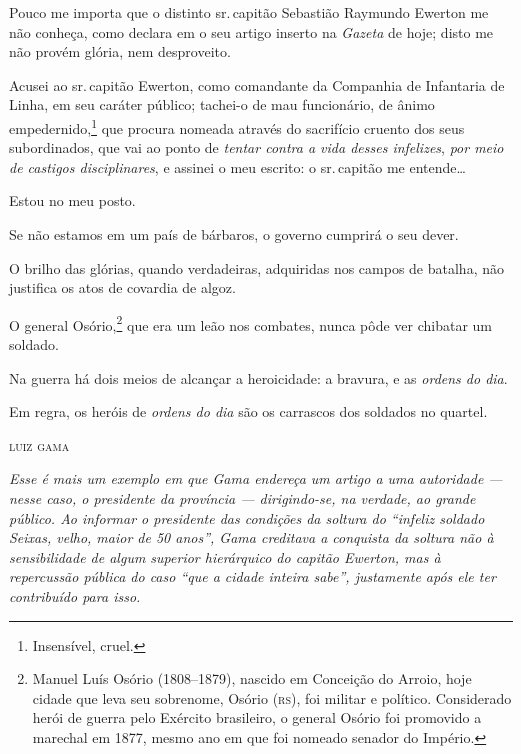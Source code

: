 {
Pouco me importa que o distinto sr.\,capitão Sebastião Raymundo Ewerton
me não conheça, como declara em o seu artigo inserto na \emph{Gazeta} de
hoje; disto me não provém glória, nem desproveito.

Acusei ao sr.\,capitão Ewerton, como comandante da Companhia de
Infantaria de Linha, em seu caráter público; tachei-o de mau
funcionário, de ânimo empedernido,\footnote{Insensível, cruel.} que
procura nomeada através do sacrifício cruento dos seus subordinados, que
vai ao ponto de \emph{tentar contra a vida desses infelizes}, \emph{por
meio de castigos disciplinares}, e assinei o meu escrito: o sr.\,capitão
me entende\ldots{}

Estou no meu posto.

Se não estamos em um país de bárbaros, o governo cumprirá o seu dever.

O brilho das glórias, quando verdadeiras, adquiridas nos campos de
batalha, não justifica os atos de covardia de algoz.

O general Osório,\footnote{Manuel Luís Osório (1808--1879), nascido em
  Conceição do Arroio, hoje cidade que leva seu sobrenome, Osório (\textsc{rs}),
  foi militar e político. Considerado herói de guerra pelo Exército
  brasileiro, o general Osório foi promovido a marechal em 1877, mesmo
  ano em que foi nomeado senador do Império.}
que era um leão nos
combates, nunca pôde ver chibatar um soldado.

Na guerra há dois meios de alcançar a heroicidade: a bravura, e as
\emph{ordens do dia}.

Em regra, os heróis de \emph{ordens do dia} são os carrascos dos
soldados no quartel.

\medskip
\hfill\textsc{luiz gama}


\begin{resumo}
\emph{Esse é mais um exemplo em que Gama endereça um artigo a uma
autoridade --- nesse caso, o presidente da província --- dirigindo-se, na
verdade, ao grande público. Ao informar o presidente das condições da
soltura do ``infeliz soldado Seixas, velho, maior de 50 anos'', Gama
creditava a conquista da soltura não à sensibilidade de algum superior
hierárquico do capitão Ewerton, mas à repercussão pública do caso ``que a
cidade inteira sabe'', justamente após ele ter contribuído para isso.}
\end{resumo}

}
